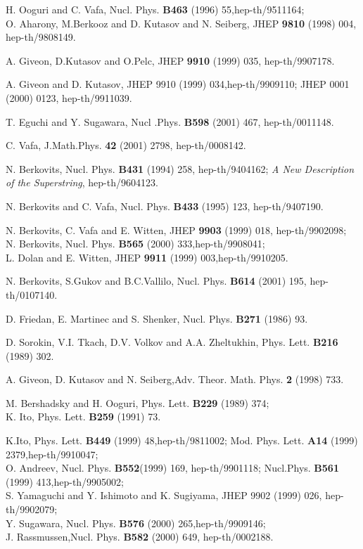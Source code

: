 \documentclass[a4paper,12pt]{article}
\begin{document}
\begin{thebibliography}{99}
H. Ooguri and C. Vafa, Nucl. Phys. {\bf B463} (1996)
	55,hep-th/9511164;\\
O. Aharony, M.Berkooz and D. Kutasov and N. Seiberg,
JHEP {\bf 9810} (1998) 004, hep-th/9808149.

A. Giveon, D.Kutasov and O.Pelc, 
JHEP {\bf 9910} (1999) 035,
hep-th/9907178.

A. Giveon and D. Kutasov, JHEP 9910 (1999) 034,hep-th/9909110;
JHEP 0001 (2000) 0123, hep-th/9911039.

T. Eguchi and Y. Sugawara, Nucl .Phys. {\bf B598} (2001) 467, hep-th/0011148.

 C. Vafa, J.Math.Phys. {\bf 42} (2001) 2798, hep-th/0008142.

N. Berkovits, Nucl. Phys. {\bf B431} (1994) 258,
	hep-th/9404162; {\it A New Description of the Superstring},
hep-th/9604123.


 N. Berkovits and C. Vafa, Nucl. Phys. {\bf B433} (1995)
	123, hep-th/9407190.

 N. Berkovits, C. Vafa and E. Witten,
JHEP {\bf 9903} (1999) 018, hep-th/9902098;\\
N. Berkovits, Nucl. Phys. {\bf B565} (2000) 333,hep-th/9908041;\\
L. Dolan and E. Witten, JHEP {\bf 9911} (1999) 003,hep-th/9910205.

 N. Berkovits, S.Gukov and B.C.Vallilo, Nucl. Phys. {\bf
	B614} (2001) 195, hep-th/0107140.

 D. Friedan, E. Martinec and S. Shenker,
Nucl. Phys. {\bf B271} (1986) 93.

D. Sorokin, V.I. Tkach, D.V. Volkov and
A.A. Zheltukhin, Phys. Lett. {\bf B216} (1989) 302.

A. Giveon, D. Kutasov and N. Seiberg,Adv. Theor. Math. Phys. {\bf 2}
	(1998) 733.

M. Bershadsky and H. Ooguri, Phys. Lett. {\bf B229} (1989) 374;\\
K. Ito, Phys. Lett. {\bf B259} (1991) 73.

K.Ito, Phys. Lett. {\bf B449} (1999) 48,hep-th/9811002;
Mod. Phys. Lett. {\bf A14} (1999) 2379,hep-th/9910047;\\
O. Andreev, Nucl. Phys. {\bf B552}(1999) 169, hep-th/9901118; Nucl.Phys.
	{\bf B561} (1999) 413,hep-th/9905002;\\
S. Yamaguchi and Y. Ishimoto and K. Sugiyama, JHEP 9902 (1999) 026,
hep-th/9902079;\\
Y. Sugawara, Nucl. Phys. {\bf B576} (2000) 265,hep-th/9909146;\\
J. Rassmussen,Nucl. Phys. {\bf B582} (2000) 649, hep-th/0002188.



\end{thebibliography}
\end{document}
